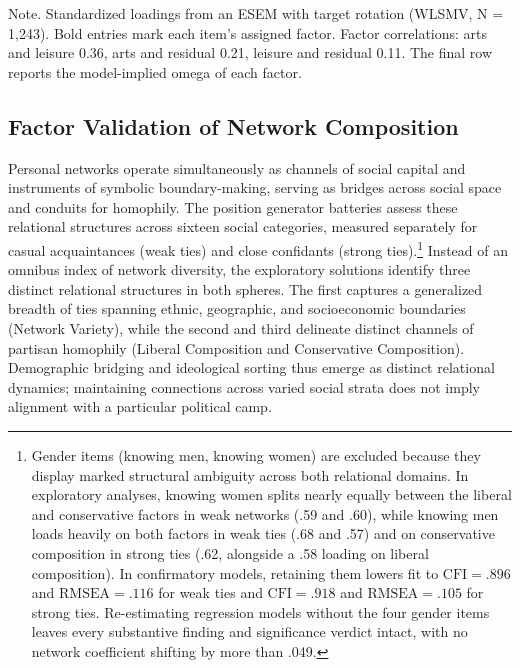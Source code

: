 \documentclass[
  12pt
]{article}
\begin{document}
Note. Standardized loadings from an ESEM with target rotation (WLSMV, N = 1,243). Bold entries mark each item's assigned factor. Factor correlations: arts and leisure 0.36, arts and residual 0.21, leisure and residual 0.11. The final row reports the model-implied omega of each factor.


\subsection{Factor Validation of Network Composition}\label{factor-validation-of-network-composition}

Personal networks operate simultaneously as channels of social capital and instruments of symbolic boundary-making, serving as bridges across social space and conduits for homophily. The position generator batteries assess these relational structures across sixteen social categories, measured separately for casual acquaintances (weak ties) and close confidants (strong ties).\footnote{Gender items (knowing men, knowing women) are excluded because they display marked structural ambiguity across both relational domains. In exploratory analyses, knowing women splits nearly equally between the liberal and conservative factors in weak networks (.59 and .60), while knowing men loads heavily on both factors in weak ties (.68 and .57) and on conservative composition in strong ties (.62, alongside a .58 loading on liberal composition). In confirmatory models, retaining them lowers fit to $\text{CFI} = .896$ and $\text{RMSEA} = .116$ for weak ties and $\text{CFI} = .918$ and $\text{RMSEA} = .105$ for strong ties. Re-estimating regression models without the four gender items leaves every substantive finding and significance verdict intact, with no network coefficient shifting by more than .049.} Instead of an omnibus index of network diversity, the exploratory solutions identify three distinct relational structures in both spheres. The first captures a generalized breadth of ties spanning ethnic, geographic, and socioeconomic boundaries (Network Variety), while the second and third delineate distinct channels of partisan homophily (Liberal Composition and Conservative Composition). Demographic bridging and ideological sorting thus emerge as distinct relational dynamics; maintaining connections across varied social strata does not imply alignment with a particular political camp.
\end{document}
